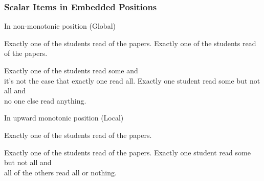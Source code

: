 \documentclass[fleqn,10pt,serif,xcolor=dvipsnames]{beamer}
\begin{document}

\begin{frame}[shrink=2]
  \frametitle{Scalar Items in Embedded Positions}
  \begin{block}{In non-monotonic position \hfill (Global)}
    \begin{exe}
       Exactly one of the students read {\color{blue}{some}} of the
      papers.
    \ex Exactly one of the students read {\color{blue}{all}} of the papers.
    \ex
      \begin{xlist}
      \ex Exactly one of the students read some and  \\
        it's not the case that exactly one read all.
      \ex Exactly one student read some but not all and  \\
        no one else read anything.
      \end{xlist}
    \end{exe}
  \end{block}
  \begin{block}{In upward monotonic position \hfill (Local)}
    \begin{exe}
       Exactly one of the students read {\color{blue}{some}} of the
      papers.
    \ex
      \begin{xlist}
      \ex Exactly one of the students read {\color{blue}{some but not all}} of the papers.
      \ex Exactly one student read some but not all and  \\
        all of the others read all or nothing.
      \end{xlist}
    \end{exe}
  \end{block}
\end{frame}
\end{document}
